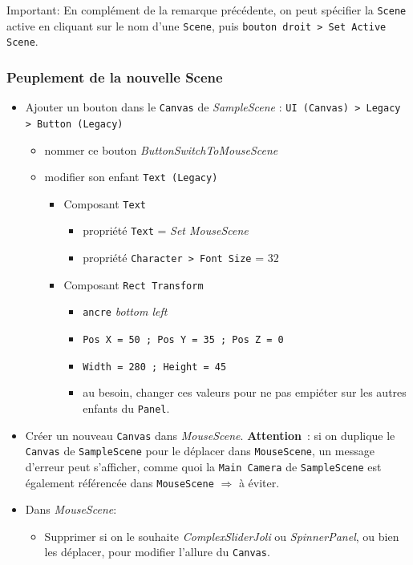 \documentclass[a4paper,10pt]{article}
\newenvironment{solution}%
{\begin{tcolorbox}[breakable,colback=red!5!white,colframe=red!75!black,title=Solution]}%
{\end{tcolorbox}}
\begin{document}
\begin{solution}
Important: En complément de la remarque précédente, on peut spécifier la \texttt{Scene} active en cliquant sur le nom d'une \texttt{Scene}, puis \texttt{bouton droit > Set Active Scene}.

\subsubsection{Peuplement de la nouvelle Scene}
\begin{itemize}	
	\item  Ajouter un bouton dans le \texttt{Canvas} de \textit{SampleScene} : \texttt{UI (Canvas) > Legacy > Button (Legacy)}
	\begin{itemize}
		\item nommer ce bouton \textit{ButtonSwitchToMouseScene}
		\item modifier son enfant \texttt{Text (Legacy)}
		\begin{itemize}
			\item Composant \texttt{Text}
			\begin{itemize}
				\item propriété \texttt{Text} = \textit{Set MouseScene}
				\item  propriété \texttt{Character > Font Size} = $32$
			\end{itemize}	
			\item Composant \texttt{Rect Transform}
			\begin{itemize}
				\item \texttt{ancre} \textit{bottom left}
				\item \texttt{Pos X = 50 ; Pos Y = 35 ; Pos Z = 0}
				\item 	\texttt{Width = 280 ; Height = 45}
				\item[$\Rightarrow$] au besoin, changer ces valeurs pour ne pas empiéter sur les autres enfants du \texttt{Panel}.
			\end{itemize}	
		\end{itemize}
	\end{itemize}

	\item Créer un nouveau \texttt{Canvas} dans \textit{MouseScene}. \textbf{Attention}~: si on duplique le \texttt{Canvas} de \texttt{SampleScene} pour le déplacer dans \texttt{MouseScene}, un message d'erreur peut s'afficher, comme quoi la \texttt{Main~Camera} de \texttt{SampleScene} est également référencée dans \texttt{MouseScene} $\Rightarrow$ à éviter.
	
	\item Dans \textit{MouseScene}:
	\begin{itemize}
		\item Supprimer si on le souhaite \textit{ComplexSliderJoli} ou \textit{SpinnerPanel}, ou bien les déplacer, pour modifier l'allure du \texttt{Canvas}.
	

\end{itemize}
\end{itemize}
\end{solution}
\end{document}
